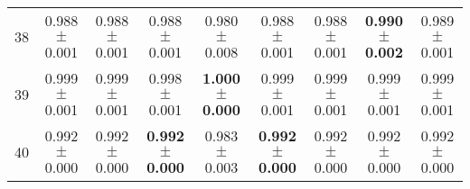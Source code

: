 \begin{table}[!ht]
{\begin{tabular}{r c c c c c c c c}
38 & 0.988 $\pm$ 0.001 & 0.988 $\pm$ 0.001 & 0.988 $\pm$ 0.001 & 0.980 $\pm$ 0.008 & 0.988 $\pm$ 0.001 & 0.988 $\pm$ 0.001 & \textbf{0.990 $\pm$ 0.002} & 0.989 $\pm$ 0.001 \\
39 & 0.999 $\pm$ 0.001 & 0.999 $\pm$ 0.001 & 0.998 $\pm$ 0.001 & \textbf{1.000 $\pm$ 0.000} & 0.999 $\pm$ 0.001 & 0.999 $\pm$ 0.001 & 0.999 $\pm$ 0.001 & 0.999 $\pm$ 0.001 \\
40 & 0.992 $\pm$ 0.000 & 0.992 $\pm$ 0.000 & \textbf{0.992 $\pm$ 0.000} & 0.983 $\pm$ 0.003 & \textbf{0.992 $\pm$ 0.000} & 0.992 $\pm$ 0.000 & 0.992 $\pm$ 0.000 & 0.992 $\pm$ 0.000 \\
\end{tabular}}
\end{table}
